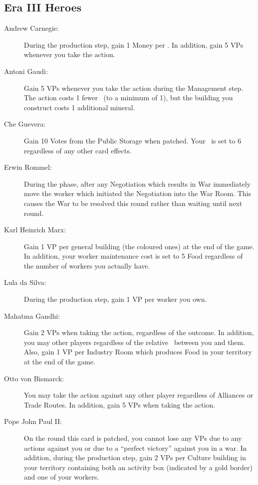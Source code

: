 \documentclass[10pt,twocolumn]{article}
\begin{document}
\begin{appendices}
\subsection{Era III Heroes}
\begin{description}
\item[Andrew Carnegie:] During the production step, gain 1 Money per \tra. In addition, gain 5 VPs whenever you take the  action.
\item[Antoni Gaudi:] Gain 5 VPs whenever you take the  action during the Management step. The  action costs 1 fewer \polf\ (to a minimum of 1), but the building you construct costs 1 additional mineral.
\item[Che Guevera:] Gain 10 Votes from the Public Storage when patched. Your \pol\ is set to 6 regardless of any other card effects.
\item[Erwin Rommel:] During the  phase, after any Negotiation which results in War immediately move the worker which initiated the Negotiation into the War Room. This causes the War to be resolved this round rather than waiting until next round.
\item[Karl Heinrich Marx:] Gain 1 VP per general building (the coloured ones) at the end of the game. In addition, your worker maintenance cost is set to 5 Food regardless of the number of workers you actually have.
\item[Lula da Silva:]During the production step, gain 1 VP per worker you own.
\item[Mahatma Gandhi:] Gain 2 VPs when taking the  action, regardless of the outcome. In addition, you may  other players regardless of the relative \mil\ between you and them. Also, gain 1 VP per Industry Room which produces Food in your territory at the end of the game.
\item[Otto von Bismarck:] You may take the  action against any other player regardless of Alliances or Trade Routes. In addition, gain 5 VPs when taking the  action.
\item[Pope John Paul II:] On the round this card is patched, you cannot lose any VPs due to any  actions against you or due to a ``perfect victory'' against you in a war. In addition, during the production step, gain 2 VPs per Culture building in your territory containing both an activity box (indicated by a gold border) and one of your workers.
\end{description}


\end{appendices}
\end{document}
